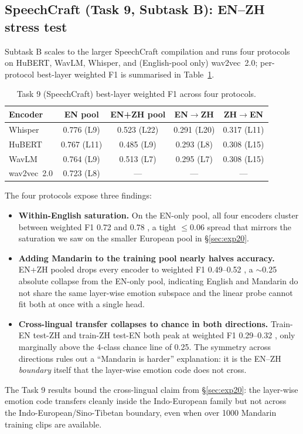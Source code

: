 \documentclass[sigconf,screen]{acmart}
\begin{document}
\subsection{SpeechCraft (Task 9, Subtask B): EN--ZH stress test}
\label{sec:enzh}
Subtask B scales to the larger SpeechCraft compilation and runs four protocols on HuBERT, WavLM, Whisper, and (English-pool only) wav2vec~2.0; per-protocol best-layer weighted F1 is summarised in Table~\ref{tab:task9}.

\begin{table}[h]
\centering
\small
\caption{Task 9 (SpeechCraft) best-layer weighted F1 across four protocols.}
\label{tab:task9}
\setlength{\tabcolsep}{4pt}
\begin{tabular}{lcccc}
\toprule
\textbf{Encoder} & \textbf{EN pool} & \textbf{EN+ZH pool} & \textbf{EN$\to$ZH} & \textbf{ZH$\to$EN} \\
\midrule
Whisper      & 0.776 (L9)  & 0.523 (L22) & 0.291 (L20) & 0.317 (L11) \\
HuBERT       & 0.767 (L11) & 0.485 (L9)  & 0.293 (L8)  & 0.308 (L15) \\
WavLM        & 0.764 (L9)  & 0.513 (L7)  & 0.295 (L7)  & 0.308 (L15) \\
wav2vec~2.0  & 0.723 (L8)  & ---         & ---         & ---         \\
\bottomrule
\end{tabular}
\end{table}

The four protocols expose three findings:
\begin{itemize}
  \item \textbf{Within-English saturation.} On the EN-only pool, all four encoders cluster between weighted F1 0.72 and 0.78 , a tight $\le$0.06 spread that mirrors the saturation we saw on the smaller European pool in \S\ref{sec:exp20}.
  \item \textbf{Adding Mandarin to the training pool nearly halves accuracy.} EN+ZH pooled drops every encoder to weighted F1 0.49--0.52 , a $\sim$0.25 absolute collapse from the EN-only pool, indicating English and Mandarin do not share the same layer-wise emotion subspace and the linear probe cannot fit both at once with a single head.
  \item \textbf{Cross-lingual transfer collapses to chance in both directions.} Train-EN test-ZH and train-ZH test-EN both peak at weighted F1 0.29--0.32 , only marginally above the 4-class chance line of 0.25. The symmetry across directions rules out a ``Mandarin is harder'' explanation: it is the EN--ZH \emph{boundary} itself that the layer-wise emotion code does not cross.
\end{itemize}
The Task 9 results bound the cross-lingual claim from \S\ref{sec:exp20}: the layer-wise emotion code transfers cleanly inside the Indo-European family but not across the Indo-European/Sino-Tibetan boundary, even when over 1000 Mandarin training clips are available.
\end{document}
